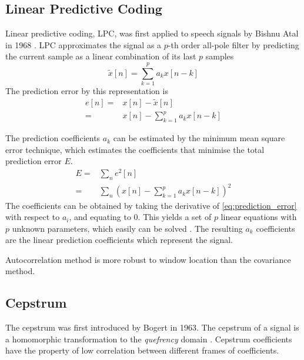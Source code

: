 \subsection{Linear Predictive Coding} %
\label{sub:lpc}
Linear predictive coding, LPC, was first applied to speech signals by Bishnu Atal \etal in 1968 \cite{atal68}. LPC approximates the signal as a $p$-th order all-pole filter by predicting the current sample as a linear combination of its last $p$ samples \cite{digsig}
\begin{equation}
	\tilde{x}[n] = \sum_{k=1}^{p}a_k x[n-k]
\end{equation}
The prediction error by this representation is 
\begin{equation}
	\begin{split}
		e[n]= & x[n]-\tilde{x}[n]\\
		= & x[n]-\sum_{k=1}^{p}a_k x[n-k]
	\end{split}
\end{equation}

The prediction coefficients $a_k$ can be estimated by the minimum mean square error technique, which estimates the coefficients that minimise the total prediction error $E$.
\begin{equation}
	\label{eq:prediction_error}
	\begin{split}
		E = & \sum_{n}e^2[n]\\
		= & \sum_{n}\left( x[n]-\sum_{k=1}^{p}a_k x[n-k] \right)^2
	\end{split}
\end{equation}
The coefficients can be obtained by taking the derivative of \eqref{eq:prediction_error} with respect to $a_i$, and equating to 0. This yields a set of $p$ linear equations with $p$ unknown parameters, which easily can be solved \cite{digsig}. The resulting $a_k$ coefficients are the linear prediction coefficients which represent the signal.

Autocorrelation method is more robust to window location than the covariance method.

\subsection{Cepstrum} %
\label{sub:cepstrum}
The cepstrum was first introduced by Bogert \etal \cite{bogert63} in 1963. The cepstrum of a signal is a homomorphic transformation to the \emph{quefrency} domain \cite{taletek}. Cepstrum coefficients have the property of low correlation between different frames of coefficients.

